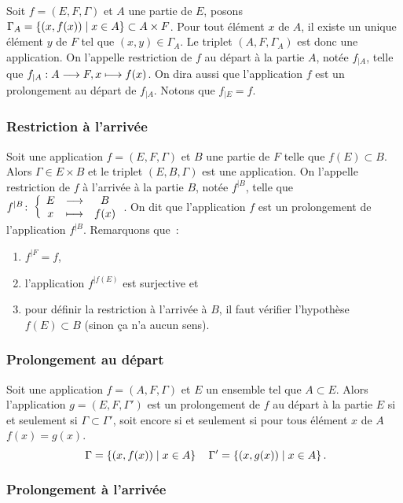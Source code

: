 Soit \(f=(E,F,\Gamma)\) et \(A\) une partie de \(E\), posons 
\(\Gamma_A=\left\{(x,f(x))\mathrel{}\middle|\mathrel{}x \in A\right\} \subset A \times F\). Pour tout élément 
\(x\) de \(A\), il existe un unique élément \(y\) de \(F\) tel que \((x,y) \in 
\Gamma_A\). Le triplet \((A,F, \Gamma_A)\) est donc une application. On 
l'appelle restriction de \(f\) au départ à la partie \(A\), notée \(f_{|A}\), 
telle que \(f_{|A}:A \longrightarrow F, x \longmapsto f(x)\). On dira aussi que l'application 
\(f\) est un prolongement au départ de \(f_{|A}\). Notons que \(f_{|E}=f\).

\subsubsection{Restriction à l'arrivée}
\label{chap3-subsubsec:restrictionarr}

Soit une application \(f=(E,F,\Gamma)\) et \(B\) une partie de \(F\) telle que 
\(f(E) \subset B\). Alors \(\Gamma \in E \times B\) et le triplet 
\((E,B,\Gamma)\) est une application. On l'appelle restriction de \(f\) à 
l'arrivée à la partie \(B\), notée \(f^{|B}\), telle que 
\(f^{|B}\colon \left\{\begin{array}{ccc} E & \longrightarrow &B\\ x & \longmapsto & f(x) \end{array} \right.\). On dit que l'application \(f\) est un 
prolongement de l'application \(f^{|B}\). Remarquons que~:
\begin{enumerate}
    \item \(f^{|F}=f\), 
    \item l'application \(f^{|f(E)}\) est surjective et 
    \item pour définir la restriction à l'arrivée à \(B\), il faut vérifier 
        l'hypothèse \(f(E) \subset B\) (sinon ça n'a aucun sens).
\end{enumerate}

\subsubsection{Prolongement au départ}
\label{chap3-subsubsec:prolongementdep}

Soit une application \(f=(A,F,\Gamma)\) et \(E\) un ensemble tel que \(A \subset 
E\). Alors l'application \(g=(E,F,\Gamma')\) est un prolongement de \(f\) au 
départ à la partie \(E\) si et seulement si \(\Gamma \subset \Gamma'\), soit 
encore si et seulement si pour tous élément \(x\) de \(A\) \(f(x)=g(x)\).
\begin{equation}\
    \Gamma=\left\{(x,f(x))\mathrel{}\middle|\mathrel{}x \in A\right\} \quad \Gamma'=\left\{(x,g(x))\mathrel{}\middle|\mathrel{}x \in A\right\}.
\end{equation}

\subsubsection{Prolongement à l'arrivée}
\label{chap3-subsubsec:prolongementarr}

